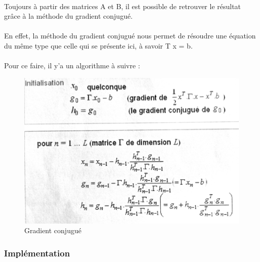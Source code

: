 \documentclass[a4paper,11pt]{article}
\begin{document}
			\paragraph{}
			Toujours à partir des matrices A et B, il est possible de retrouver le résultat grâce à la méthode du gradient conjugué.

			\paragraph{}
			En effet, la méthode du gradient conjugué nous permet de résoudre une équation du même type que celle qui se présente ici, à savoir T \time x = b.


			\paragraph{}
			Pour ce faire, il y'a un algorithme à suivre :

			\begin{figure}[h]
				\centerline{\includegraphics[scale=0.50]{img/gradient_conjugue.png}}
				\caption{Gradient conjugué }
				\label{diagramme-composants}
			\end{figure}

			\subsubsection{Implémentation}
\end{document}
